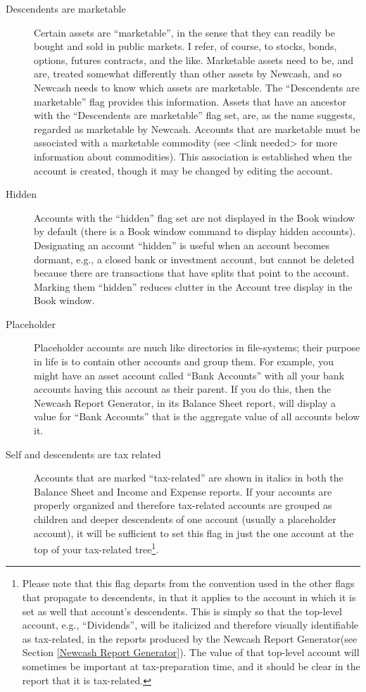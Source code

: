\documentclass{report}
\begin{document}
\begin{description}
\begin{description}
\item [Descendents are marketable] Certain assets are ``marketable'', in the sense that they can readily be bought and sold in public markets. I refer, of course, to stocks, bonds, options, futures contracts, and the like. Marketable assets need to be, and are, treated somewhat differently than other assets by Newcash, and so Newcash needs to know which assets are marketable. The ``Descendents are marketable'' flag provides this information. Assets that have an ancestor with the ``Descendents are marketable''  flag set, are, as the name suggests, regarded as marketable by Newcash. Accounts that are marketable must be associated with a marketable commodity (see <link needed> for more information about commodities). This association is established when the account is created, though it may be changed by editing the account.

\item [Hidden] Accounts with the ``hidden'' flag set are not displayed in the Book window by default (there is a Book window command to display hidden accounts). Designating an account ``hidden'' is useful when an account becomes dormant, e.g., a closed bank or investment account, but cannot be deleted because there are transactions that have splits that point to the account. Marking them ``hidden'' reduces clutter in the Account tree display in the Book window.

\item [Placeholder] Placeholder accounts are much like directories in file-systems; their purpose in life is to contain other accounts and group them. For example, you might have an asset account called ``Bank Accounts'' with all your bank accounts having this account as their parent. If you do this, then the Newcash Report Generator, in its Balance Sheet report, will display a value for ``Bank Accounts'' that is the aggregate value of all accounts below it.

\item [Self and descendents are tax related] Accounts that are marked ``tax-related'' are shown in italics in both the Balance Sheet and Income and Expense reports. If your accounts are properly organized and therefore tax-related accounts are grouped as children and deeper descendents of one account (usually a placeholder account), it will be sufficient to set this flag in just the one account at the top of your tax-related tree\footnote{Please note that this flag departs from the convention used in the other flags that propagate to descendents, in that it applies to the account in which it is set as well that account's descendents. This is simply so that the top-level account, e.g., ``Dividends'', will be italicized and therefore visually identifiable as tax-related, in the reports produced by the Newcash Report Generator(see Section \ref{Newcash Report Generator}). The value of that top-level account will sometimes be important at tax-preparation time, and it should be clear in the report that it is tax-related.}. 


\end{description}
\end{description}
\end{document}
